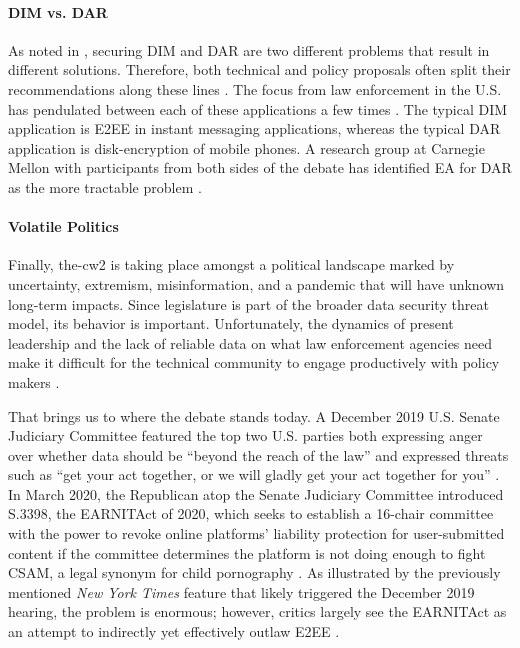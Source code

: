 \paragraph*{\ac{DIM} vs. \ac{DAR}} As noted in , securing \acl{DIM} and \acl{DAR} are two
different problems that result in different solutions. Therefore, both technical and policy proposals often split their
recommendations along these lines \cite{group_2019} \cite{owen_law_2018}. The focus from law enforcement in the U.S. has
pendulated between each of these applications a few times \cite{schneier_2019}. The typical \ac{DIM} application is
\ac{E2EE} in instant messaging applications, whereas the typical \ac{DAR} application is \ac{disk-encryption} of mobile
phones. A research group at Carnegie Mellon with participants from both sides of the debate has identified \ac{EA} for
\ac{DAR} as the more tractable problem \cite{group_2019}.

\paragraph*{Volatile Politics} Finally, \ac{the-cw2} is taking place amongst a political landscape marked by
uncertainty, extremism, misinformation, and a pandemic that will have unknown long-term  impacts. Since legislature is
part of the broader data security threat model, its behavior is important. Unfortunately, the dynamics of present
leadership and the lack of reliable data on what law enforcement agencies need make it difficult for the technical
community to engage productively with policy makers \cite{granick_2018}.

That brings us to where the debate stands today. A December 2019 U.S. Senate Judiciary Committee featured the top two
U.S. parties both expressing anger over whether data should be ``beyond the reach of the law'' and expressed threats
such as ``get your act together, or we will gladly get your act together for you'' \cite{geller_2019}. In March 2020,
the Republican atop the Senate Judiciary Committee introduced S.3398, the \ac{EARNITAct} of 2020, which seeks to
establish a 16-chair committee with the power to revoke online platforms' liability protection for user-submitted
content if the committee determines the platform is not doing enough to fight \ac{CSAM}, a legal synonym for child
pornography \cite{graham_s3398_2020}. As illustrated by the previously mentioned \textit{New York Times} feature
\cite{keller_internet_2019} that likely triggered the December 2019 hearing, the problem is enormous; however, critics
largely see the \ac{EARNITAct} as an attempt to indirectly yet effectively outlaw \ac{E2EE} \cite{newman_2020}
\cite{pfefferkorn_2020}.

